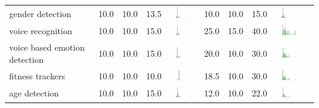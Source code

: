 \begin{table}[t]
\begin{center}
\begin{tabular}{| p{2cm} | p{1cm} | p{1cm} | p{1cm} | c | p{2cm} | p{1cm} | p{1cm} | p{1cm} | c |}
gender detection & 10.0 & 10.0 & 13.5 & \includegraphics[width = 2cm, height = 0.5cm]{tex-inputs/appendix/riskbenefit-images/genderdetectionrisk} & 10.0 & 10.0 & 15.0 & \includegraphics[width = 2cm, height = 0.5cm]{tex-inputs/appendix/riskbenefit-images/genderdetectionben} \\ 
voice recognition & 10.0 & 10.0 & 15.0 & \includegraphics[width = 2cm, height = 0.5cm]{tex-inputs/appendix/riskbenefit-images/voicerecognitionrisk} & 25.0 & 15.0 & 40.0 & \includegraphics[width = 2cm, height = 0.5cm]{tex-inputs/appendix/riskbenefit-images/voicerecognitionben} \\ 
voice based emotion detection & 10.0 & 10.0 & 15.0 & \includegraphics[width = 2cm, height = 0.5cm]{tex-inputs/appendix/riskbenefit-images/voicebasedemotiondetectionrisk} & 20.0 & 10.0 & 30.0 & \includegraphics[width = 2cm, height = 0.5cm]{tex-inputs/appendix/riskbenefit-images/voicebasedemotiondetectionben} \\ 
fitness trackers & 10.0 & 10.0 & 10.0 & \includegraphics[width = 2cm, height = 0.5cm]{tex-inputs/appendix/riskbenefit-images/fitnesstrackersrisk} & 18.5 & 10.0 & 30.0 & \includegraphics[width = 2cm, height = 0.5cm]{tex-inputs/appendix/riskbenefit-images/fitnesstrackersben} \\ 
age detection & 10.0 & 10.0 & 15.0 & \includegraphics[width = 2cm, height = 0.5cm]{tex-inputs/appendix/riskbenefit-images/agedetectionrisk} & 12.0 & 10.0 & 22.0 & \includegraphics[width = 2cm, height = 0.5cm]{tex-inputs/appendix/riskbenefit-images/agedetectionben} \\ 

\end{tabular}
\end{center}
\end{table}
